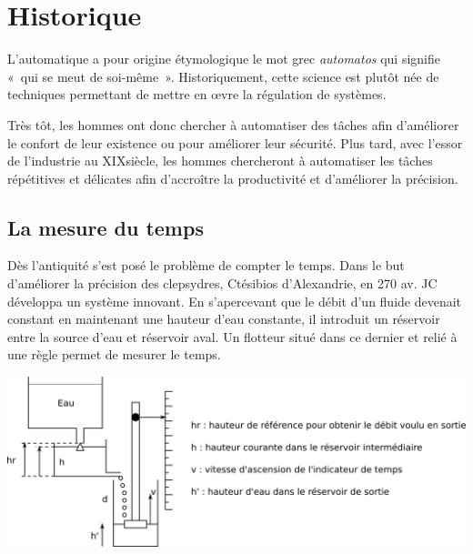 \documentclass[10pt,fleqn]{article} %
\begin{document}
%

%


\section{Historique}
L'automatique a pour origine étymologique le mot grec \textit{automatos} qui
signifie «~qui se meut de soi-même~». Historiquement, cette science est
plutôt née de techniques permettant de mettre en \oe{}vre la régulation de
systèmes.

Très tôt, les hommes ont donc chercher à automatiser des tâches afin
d'améliorer le confort de leur existence ou pour améliorer leur sécurité. Plus
tard, avec l'essor de l'industrie au XIX\ieme siècle, les hommes chercheront à
automatiser les tâches répétitives et délicates afin d'accroître la
productivité et d'améliorer la précision.

\subsection{La mesure du temps}

Dès l'antiquité s'est posé le problème de compter le temps. Dans le but
d'améliorer la précision des clepsydres, Ctésibios d'Alexandrie, en 270 av.
JC développa un système innovant. En s'apercevant que le débit d'un fluide
devenait constant en maintenant une hauteur d'eau constante, il introduit un
réservoir entre la source d'eau et réservoir aval. Un flotteur situé dans ce
dernier et relié à une règle permet de mesurer le temps.

 \begin{center}
 \includegraphics[width=.8\textwidth]{images/clepsydre}
 \end{center}
\end{document}
